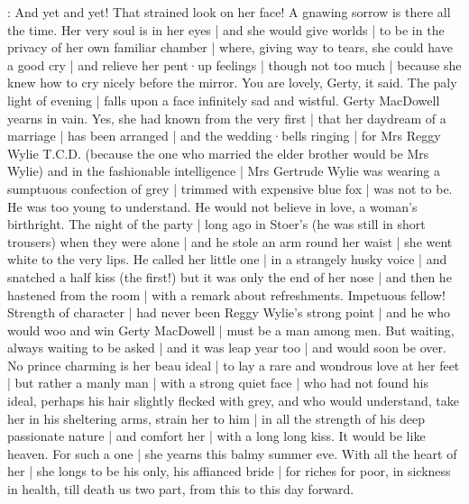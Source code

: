 :
And yet and yet!
That strained look on her face!
A gnawing sorrow is there all the time.
Her very soul is in her eyes |
and she would give worlds |
to be in the privacy of her own familiar chamber |
where,
giving way to tears,
she could have a good cry |
and relieve her pent·up feelings |
though not too much |
because she knew how to cry nicely before the mirror.
You are lovely,
Gerty,
it said.
The paly light of evening |
falls upon a face infinitely sad and wistful.
Gerty MacDowell yearns in vain.
Yes,
she had known from the very first |
that her daydream of a marriage |
has been arranged |
and the wedding·bells ringing |
for Mrs Reggy Wylie T.C.D.
(because the one who married the elder brother
would be Mrs Wylie)
and in the fashionable intelligence |
Mrs Gertrude Wylie was wearing a sumptuous confection of grey |
trimmed with expensive blue fox |
was not to be.
He was too young to understand.
He would not believe in love,
a woman's birthright.
The night of the party |
long ago in Stoer's
(he was still in short trousers)
when they were alone |
and he stole an arm round her waist |
she went white
to the very lips.
He called her little one |
in a strangely husky voice |
and snatched a half kiss
(the first!)
but it was only the end of her nose |
and then he hastened from the room |
with a remark about refreshments.
Impetuous fellow!
Strength of character |
had never been Reggy Wylie's strong point |
and he who would woo and win Gerty MacDowell |
must be a man among men.
But waiting,
always waiting to be asked |
and it was leap year too |
and would soon be over.
No prince charming is her beau ideal |
to lay a rare and wondrous love at her feet |
but rather a manly man |
with a strong quiet face |
who had not found his ideal,
perhaps his hair slightly flecked with grey,
and who would understand,
take her in his sheltering arms,
strain her to him |
in all the strength of his deep passionate nature |
and comfort her |
with a long long kiss.
It would be like heaven.
For such a one |
she yearns this balmy summer eve.
With all the heart of her |
she longs to be his only,
his affianced bride |
for riches
for poor,
in sickness
in health,
till death us two part,
from this
to this day forward.

